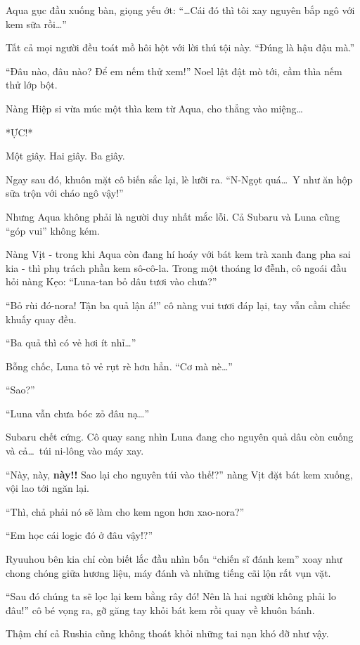 \documentclass[../main.tex]{subfiles}
\begin{document}
Aqua gục đầu xuống bàn, giọng yếu ớt: ``\dots Cái đó thì tôi xay nguyên bắp ngô với kem sữa rồi\dots''

Tất cả mọi người đều toát mồ hôi hột với lời thú tội này. ``Đúng là hậu đậu mà.''

``Đâu nào, đâu nào? Để em nếm thử xem!'' Noel lật đật mò tới, cầm thìa nếm thử lớp bột.

Nàng Hiệp si vừa múc một thìa kem từ Aqua, cho thẳng vào miệng\dots

*ỰC!*

Một giây. Hai giây. Ba giây.

Ngay sau đó, khuôn mặt cô biến sắc lại, lè lưỡi ra. ``N-Ngọt quá\dots\ Y như ăn hộp sữa trộn với cháo ngô vậy!''

\ct

Nhưng Aqua không phải là người duy nhất mắc lỗi. Cả Subaru và Luna cũng ``góp vui'' không kém.

Nàng Vịt - trong khi Aqua còn đang hí hoáy với bát kem trà xanh đang pha sai kia - thì phụ trách phần kem sô-cô-la. Trong một thoáng lơ đễnh, cô ngoái đầu hỏi nàng Kẹo: ``Luna-tan bỏ dâu tươi vào chưa?''

``Bỏ rùi đó-nora! Tận ba quả lận á!'' cô nàng vui tươi đáp lại, tay vẫn cầm chiếc khuấy quay đều.

``Ba quả thì có vẻ hơi ít nhỉ\dots''

Bỗng chốc, Luna tỏ vẻ rụt rè hơn hẳn. ``Cơ mà nè\dots''

``Sao?''

``Luna vẫn chưa bóc zỏ đâu nạ\dots''

Subaru chết cứng. Cô quay sang nhìn Luna đang cho nguyên quả dâu còn cuống và cả\dots\ túi ni-lông vào máy xay.

``Này, này, \textbf{này!!} Sao lại cho nguyên túi vào thế!?'' nàng Vịt đặt bát kem xuống, vội lao tới ngăn lại.

``Thì, chả phải nó sẽ làm cho kem ngon hơn xao-nora?''

``Em học cái logic đó ở đâu vậy!?''

Ryuuhou bên kia chỉ còn biết lắc đầu nhìn bốn ``chiến sĩ đánh kem'' xoay như chong chóng giữa hương liệu, máy đánh và những tiếng cãi lộn rất vụn vặt.

``Sau đó chúng ta sẽ lọc lại kem bằng rây đó! Nên là hai người không phải lo đâu!'' cô bé vọng ra, gỡ găng tay khỏi bát kem rồi quay về khuôn bánh.

\ct

Thậm chí cả Rushia cũng không thoát khỏi những tai nạn khó đỡ như vậy.
\end{document}
